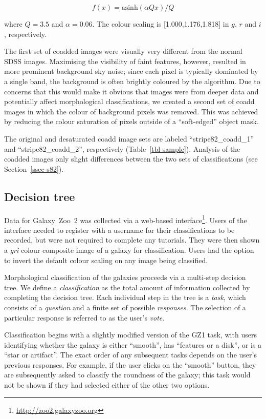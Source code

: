 \documentclass[useAMS,usenatbib]{mn2e}
\begin{document}
\begin{equation}
f(x)=\text{asinh}(\alpha Q x)/Q
\label{eqn-imagegen}
\end{equation}

\noindent where $Q=3.5$ and $\alpha=0.06$. The colour scaling is [1.000,1.176,1.818] in $g$, $r$ and $i$, respectively. 

The first set of coadded images were visually very different from the normal SDSS images. Maximising the visibility of faint features, however, resulted in more prominent background sky noise; since each pixel is typically dominated by a single band, the background is often brightly coloured by the \citet{lup04} algorithm. Due to concerns that this would make it obvious that images were from deeper data and potentially affect morphological classifications, we created a second set of coadd images in which the colour of background pixels was removed. This was achieved by reducing the colour saturation of pixels outside of a ``soft-edged'' object mask. 

The original and desaturated coadd image sets are labeled ``stripe82\_coadd\_1'' and ``stripe82\_coadd\_2'', respectively (Table~\ref{tbl-sample}). Analysis of the coadded images only slight differences between the two sets of classifications (see Section~\ref{ssec-s82}). 

\subsection{Decision tree}\label{ssec-decision_tree}

Data for Galaxy~Zoo~2 was collected via a web-based interface\footnote{\url{http://zoo2.galaxyzoo.org}}. Users of the interface needed to register with a username for their classifications to be recorded, but were not required to complete any tutorials. They were then shown a {\it gri} colour composite image of a galaxy for classification. Users had the option to invert the default colour scaling on any image being classified. 

Morphological classification of the galaxies proceeds via a multi-step decision tree. We define a {\it classification} as the total amount of information collected by completing the decision tree. Each individual step in the tree is a {\it task}, which consists of a {\it question} and a finite set of possible {\it responses}. The selection of a particular response is referred to as the user's {\it vote}. 

Classification begins with a slightly modified version of the GZ1 task, with users identifying whether the galaxy is either ``smooth'', has ``features or a disk'', or is a ``star or artifact''. The exact order of any subsequent tasks depends on the user's previous responses. For example, if the user clicks on the ``smooth'' button, they are subsequently asked to classify the roundness of the galaxy; this task would not be shown if they had selected either of the other two options. 
\end{document}
